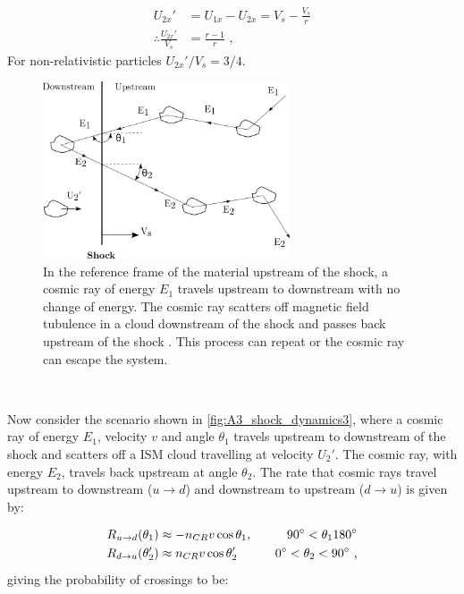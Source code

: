 \begin{equation}
    \begin{aligned}
        U_{2x}'&=U_{1x}-U_{2x} =V_s- \frac{V_s}{r} \\
        \therefore \frac{U_{2x}'}{V_s}&=\frac{r-1}{r}\text{ ,}
    \end{aligned} \label{eq:down_upstream_v_ratio}
\end{equation}
\noindent For non-relativistic particles ${U_{2x}'}/{V_s}=3/4$.
\begin{figure}
	\centering
	\includegraphics[width=0.65\textwidth]{A3_Diffusive_Shock_Acceleration/Images/dsa.png}
	\caption{In the reference frame of the material upstream of the shock, a cosmic ray of energy $E_1$ travels upstream to downstream with no change of energy. The cosmic ray scatters off magnetic field tubulence in a  cloud downstream of the shock and passes back upstream of the shock . This process can repeat or the cosmic ray can escape the system.}
	\label{fig:A3_shock_dynamics3}
\end{figure}
\par~\par 
Now consider the scenario shown in \autoref{fig:A3_shock_dynamics3}, where a cosmic ray of energy $E_1$, velocity $v$ and angle $\theta_1$ travels upstream to downstream of the shock and scatters off a ISM cloud travelling at velocity $U_2'$. The cosmic ray, with energy $E_2$, travels back upstream at angle $\theta_2$. The rate that cosmic rays travel upstream to downstream ($u\rightarrow d$) and downstream to upstream ($d\rightarrow u$) is given by:


\begin{alignat}{2}
    R_{u\rightarrow d}\qty(\theta_1)&\approx-n_{CR}v\cos\theta_1,\quad &\ang{90}<\theta_1\ang{180} \\
    R_{d\rightarrow u}\qty(\theta_2')&\approx n_{CR}v\cos\theta_2'\quad&\ang{0}<\theta_2<\ang{90} \text{ ,}
\end{alignat}
\noindent giving the probability of crossings to be:

